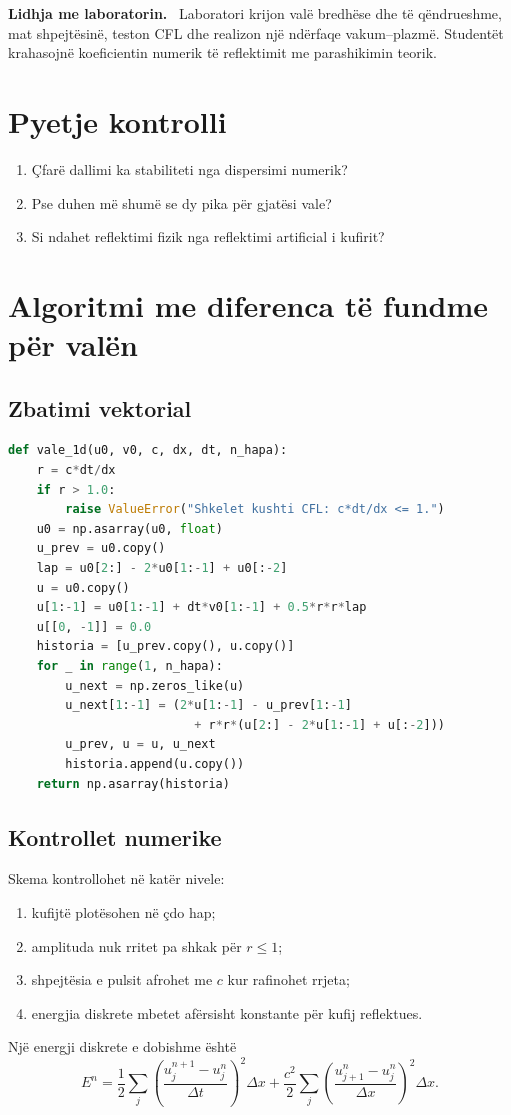 \documentclass[11pt,oneside,openany]{book}
\newenvironment{lidhje}{\par\medskip\noindent\textbf{Lidhja me laboratorin.}\ }{\par\medskip}
\begin{document}
\begin{lidhje}
Laboratori krijon valë bredhëse dhe të qëndrueshme, mat shpejtësinë, teston CFL dhe realizon një ndërfaqe vakum--plazmë. Studentët krahasojnë koeficientin numerik të reflektimit me parashikimin teorik.
\end{lidhje}

\section*{Pyetje kontrolli}
\begin{enumerate}
\item Çfarë dallimi ka stabiliteti nga dispersimi numerik?
\item Pse duhen më shumë se dy pika për gjatësi vale?
\item Si ndahet reflektimi fizik nga reflektimi artificial i kufirit?
\end{enumerate}

\section{Algoritmi me diferenca të fundme për valën}
\subsection{Zbatimi vektorial}
\begin{lstlisting}[language=Python,caption={Skema eksplicite e valës me skaje të fiksuara.}]
def vale_1d(u0, v0, c, dx, dt, n_hapa):
    r = c*dt/dx
    if r > 1.0:
        raise ValueError("Shkelet kushti CFL: c*dt/dx <= 1.")
    u0 = np.asarray(u0, float)
    u_prev = u0.copy()
    lap = u0[2:] - 2*u0[1:-1] + u0[:-2]
    u = u0.copy()
    u[1:-1] = u0[1:-1] + dt*v0[1:-1] + 0.5*r*r*lap
    u[[0, -1]] = 0.0
    historia = [u_prev.copy(), u.copy()]
    for _ in range(1, n_hapa):
        u_next = np.zeros_like(u)
        u_next[1:-1] = (2*u[1:-1] - u_prev[1:-1]
                          + r*r*(u[2:] - 2*u[1:-1] + u[:-2]))
        u_prev, u = u, u_next
        historia.append(u.copy())
    return np.asarray(historia)
\end{lstlisting}

\subsection{Kontrollet numerike}
Skema kontrollohet në katër nivele:
\begin{enumerate}
\item kufijtë plotësohen në çdo hap;
\item amplituda nuk rritet pa shkak për $r\le1$;
\item shpejtësia e pulsit afrohet me $c$ kur rafinohet rrjeta;
\item energjia diskrete mbetet afërsisht konstante për kufij reflektues.
\end{enumerate}
Një energji diskrete e dobishme është
\begin{equation}
 E^n=\frac12\sum_j\left(\frac{u_j^{n+1}-u_j^n}{\Delta t}\right)^2\Delta x
 +\frac{c^2}{2}\sum_j\left(\frac{u_{j+1}^n-u_j^n}{\Delta x}\right)^2\Delta x.
\end{equation}
\end{document}
